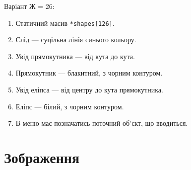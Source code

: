 
\def\basedir{/home/theammir/labs/oop}


\usepackage{graphicx}


\def\thelabid{lab2}

\taskspec%
Варіант Ж = 26:
\begin{enumerate}
	\item Статичний масив \texttt{*shapes[126]}.
	\item Слід --- суцільна лінія синього кольору.
	\item Увід прямокутника --- від кута до кута.
	\item Прямокутник --- блакитний, з чорним контуром.
	\item Увід еліпса --- від центру до кута прямокутника.
	\item Еліпс --- білий, з чорним контуром.
	\item В меню має позначатись поточний об'єкт, що вводиться.
\end{enumerate}
  

\codetext%

\section{Зображення}

